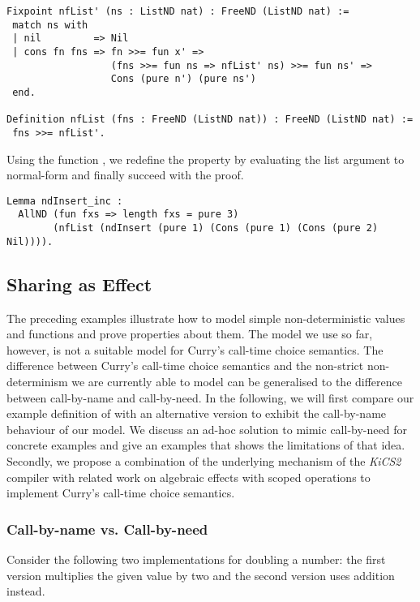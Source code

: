\begin{verbatim}
Fixpoint nfList' (ns : ListND nat) : FreeND (ListND nat) :=
 match ns with
 | nil         => Nil
 | cons fn fns => fn >>= fun x' =>
                  (fns >>= fun ns => nfList' ns) >>= fun ns' =>
                  Cons (pure n') (pure ns')
 end.

Definition nfList (fns : FreeND (ListND nat)) : FreeND (ListND nat) :=
 fns >>= nfList'.
\end{verbatim}

Using the function , we redefine the property by evaluating the list argument to normal-form and finally succeed with the proof.

\begin{verbatim}
Lemma ndInsert_inc :
  AllND (fun fxs => length fxs = pure 3)
        (nfList (ndInsert (pure 1) (Cons (pure 1) (Cons (pure 2) Nil)))).
\end{verbatim}

\subsection{Sharing as Effect}

The preceding examples illustrate how to model simple non-deterministic values and functions and prove properties about them.
The model we use so far, however, is not a suitable model for Curry's call-time choice semantics.
The difference between Curry's call-time choice semantics and the non-strict non-determinism we are currently able to model can be generalised to the difference between call-by-name and call-by-need.
In the following, we will first compare our example definition of  with an alternative version to exhibit the call-by-name behaviour of our model.
We discuss an ad-hoc solution to mimic call-by-need for concrete examples and give an examples that shows the limitations of that idea.
Secondly, we propose a combination of the underlying mechanism of the \emph{KiCS2} compiler with related work on algebraic effects with scoped operations to implement Curry's call-time choice semantics.


\subsubsection{Call-by-name vs. Call-by-need}
\label{subsubsec:cbneed}
 
Consider the following two implementations for doubling a number: the first version multiplies the given value by two and the second version uses addition instead.

